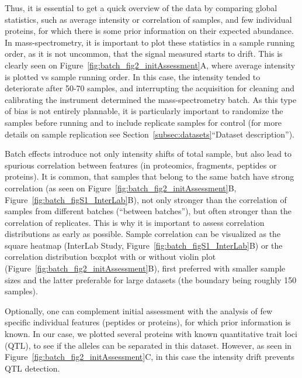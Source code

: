 \documentclass[num-refs]{wiley-article}
\begin{document}
Thus, it is essential to get a quick overview of the data by comparing global statistics, such as average intensity or correlation of samples, and few individual proteins, for which there is some prior information on their expected abundance. In mass-spectrometry, it is important to plot these statistics in a sample running order, as it is not uncommon, that the signal measured starts to drift. This is clearly seen on Figure~\ref{fig:batch_fig2_initAssessment}A, where average intensity is plotted vs sample running order. In this case, the intensity tended to deteriorate after 50-70 samples, and interrupting the acquisition for cleaning and calibrating the instrument determined the mass-spectrometry batch. As this type of bias is not entirely plannable, it is particularly important to randomize the samples before running and to include replicate samples for control (for more details on sample replication see Section~\ref{subsec:datasets}“Dataset description”). 

Batch effects introduce not only intensity shifts of total sample, but also lead to spurious correlation between features (in proteomics, fragments, peptides or proteins). It is common, that samples that belong to the same batch have strong correlation (as seen on Figure~\ref{fig:batch_fig2_initAssessment}B, Figure~\ref{fig:batch_figS1_InterLab}B), not only stronger than the correlation of samples from different batches (“between batches”), but often stronger than the correlation of replicates. This is why it is important to assess correlation distributions as early as possible. Sample correlation can be visualized as the square heatmap (InterLab Study, Figure~\ref{fig:batch_figS1_InterLab}B) or the correlation distribution boxplot with or without violin plot (Figure~\ref{fig:batch_fig2_initAssessment}B), first preferred with smaller sample sizes and the latter preferable for large datasets (the boundary being roughly 150 samples).

Optionally, one can complement initial assessment with the analysis of few specific individual features (peptides or proteins), for which prior information is known. In our case, we plotted several proteins with known quantitative trait loci (QTL), to see if the alleles can be separated in this dataset. However, as seen in Figure~\ref{fig:batch_fig2_initAssessment}C, in this case the intensity drift prevents QTL detection.
\end{document}
